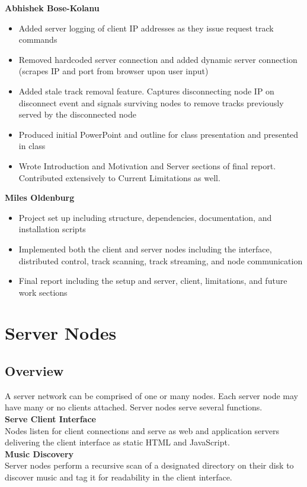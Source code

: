 \documentclass[12pt]{article}
\begin{document}
\textbf{Abhishek Bose-Kolanu}
\begin{itemize}
\item Added server logging of client IP addresses as they issue request track commands
\item Removed hardcoded server connection and added dynamic server connection (scrapes IP and port from browser upon user input)
\item Added stale track removal feature. Captures disconnecting node IP on disconnect event and signals surviving nodes to remove tracks previously served by the disconnected node
\item Produced initial PowerPoint and outline for class presentation and presented in class
\item Wrote Introduction and Motivation and Server sections of final report. Contributed extensively to Current Limitations as well.
\end{itemize}

\textbf{Miles Oldenburg}
\begin{itemize}
\item Project set up including structure, dependencies, documentation, and installation scripts
\item Implemented both the client and server nodes including the interface, distributed control, track scanning, track streaming, and node communication
\item Final report including the setup and server, client, limitations, and future work sections
\end{itemize}

\section{Server Nodes}

\subsection{Overview}
A server network can be comprised of one or many nodes. Each server node may have many or no clients attached. Server nodes serve several functions.\\

\textbf{Serve Client Interface}\\
Nodes listen for client connections and serve as web and application servers delivering the client interface as static HTML and JavaScript.\\

\textbf{Music Discovery}\\
Server nodes perform a recursive scan of a designated directory on their disk to discover music and tag it for readability in the client interface.\\
\end{document}
